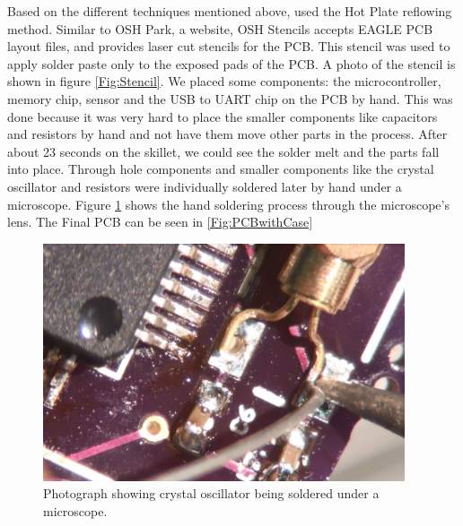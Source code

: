 Based on the different techniques mentioned above,
used the Hot Plate reflowing method.
Similar to OSH Park, a website, OSH Stencils accepts EAGLE PCB layout files,
and provides laser cut stencils for the PCB.
This stencil was used to apply solder paste only to the exposed pads of the PCB.
A photo of the stencil is shown in figure \ref{Fig:Stencil}.
We placed some components: the microcontroller, memory chip,
sensor and the USB to UART chip on the PCB by hand.
This was done because it was very hard to place the smaller components
like capacitors and resistors by hand and not have them move other parts in the process.
After about 23 seconds on the skillet,
we could see the solder melt and the parts fall into place.
Through hole components and smaller components like the crystal oscillator and resistors were individually soldered later by hand under a microscope.
Figure \ref{Fig:PCBMicro} shows the hand soldering process through the microscope's lens. The Final PCB can be seen in \ref{Fig:PCBwithCase}
\begin{figure}
\begin{center}
\includegraphics[width=0.95\textwidth]{images/PCBMicro.jpg}
\caption{Photograph showing crystal oscillator being soldered under a microscope.}
\label{Fig:PCBMicro}
\end{center}
\end{figure}
